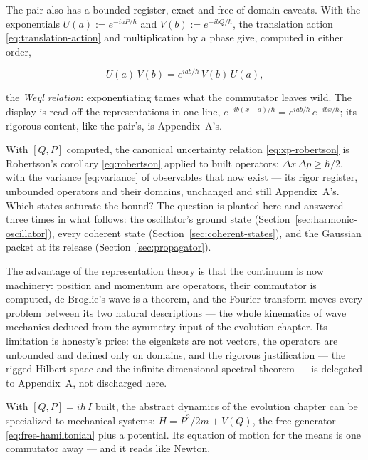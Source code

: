 The pair also has a bounded register, exact and free of domain caveats. With the exponentials $U(a) := e^{-iaP/\hbar}$ and $V(b) := e^{-ibQ/\hbar}$, the translation action \eqref{eq:translation-action} and multiplication by a phase give, computed in either order,
\begin{linenomath}
    \begin{equation}
        U(a)\,V(b) = e^{iab/\hbar}\,V(b)\,U(a),
        \label{eq:weyl-relations}
    \end{equation}
\end{linenomath}
the \emph{Weyl relation}: exponentiating tames what the commutator leaves wild. The display is read off the representations in one line, $e^{-ib(x-a)/\hbar} = e^{iab/\hbar}\,e^{-ibx/\hbar}$; its rigorous content, like the pair's, is Appendix~A's.

With $[Q, P]$ computed, the canonical uncertainty relation \eqref{eq:xp-robertson} is Robertson's corollary \eqref{eq:robertson} applied to built operators: $\Delta x\,\Delta p \geq \hbar/2$, with the variance \eqref{eq:variance} of observables that now exist --- its rigor register, unbounded operators and their domains, unchanged and still Appendix~A's. Which states saturate the bound? The question is planted here and answered three times in what follows: the oscillator's ground state (Section~\ref{sec:harmonic-oscillator}), every coherent state (Section~\ref{sec:coherent-states}), and the Gaussian packet at its release (Section~\ref{sec:propagator}).

The advantage of the representation theory is that the continuum is now machinery: position and momentum are operators, their commutator is computed, de Broglie's wave is a theorem, and the Fourier transform moves every problem between its two natural descriptions --- the whole kinematics of wave mechanics deduced from the symmetry input of the evolution chapter. Its limitation is honesty's price: the eigenkets are not vectors, the operators are unbounded and defined only on domains, and the rigorous justification --- the rigged Hilbert space and the infinite-dimensional spectral theorem --- is delegated to Appendix~A, not discharged here.

With $[Q, P] = i\hbar\,I$ built, the abstract dynamics of the evolution chapter can be specialized to mechanical systems: $H = P^2/2m + V(Q)$, the free generator \eqref{eq:free-hamiltonian} plus a potential. Its equation of motion for the means is one commutator away --- and it reads like Newton.

